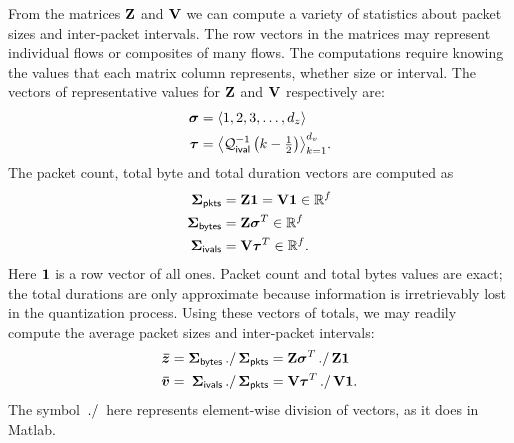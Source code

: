 \documentclass[twocolumn,final]{svjour3}
\begin{document}
From the matrices $\mathbf{Z}$ and $\mathbf{V}$ we can compute a variety of statistics about packet sizes and inter-packet intervals.
The row vectors in the matrices may represent individual flows or composites of many flows.
The computations require knowing the values that each matrix column represents, whether size or interval.
The vectors of representative values for $\mathbf{Z}$ and $\mathbf{V}$ respectively are:
\begin{align}
\vec{\sigma} &= \tuple{1,2,3,\dots,d_z} \\
\vec{\tau}   &= \tuple{\Df_\ival\left(k-\smallfrac{1}{2}\right)}_{k=1}^{d_v}.
\end{align}
The packet count, total byte and total duration vectors are computed as
\begin{align}
\vec{\Sigma}_\pkts  &= \mat{Z}\ones = \mat{V}\ones \in \R^f \eqn{packet-count}\\
\vec{\Sigma}_\bytes &= \mat{Z}\trans{\vec{\sigma}} \in \R^f \eqn{total-bytes} \\
\vec{\Sigma}_\ivals &= \mat{V}\trans{\vec{\tau}} \in \R^f \eqn{total-duration}.
\end{align}
Here $\mathbf{1}$ is a row vector of all ones.\onesnote
Packet count and total bytes values are exact;
the total durations are only approximate because information is irretrievably lost in the quantization process.
Using these vectors of totals, we may readily compute the average packet sizes and inter-packet intervals:
\begin{align}
\vec{\mean{z}} &=
  \vec{\Sigma}_\bytes \eldiv \vec{\Sigma}_\pkts
  \phantom{= \mat{V}\trans{\vec{\tau}} \eldiv \mat{V}\ones}
  \mathllap{= \mat{Z}\trans{\vec{\sigma}} \eldiv \mat{Z}\ones} \\
\vec{\mean{v}} &=
  \phantom{\vec{\Sigma}_\bytes \eldiv \vec{\Sigma}_\pkts}
  \mathllap{\vec{\Sigma_{\ivals}} \eldiv \vec{\Sigma_{\pkts}}}
  = \mat{V}\trans{\vec{\tau}} \eldiv \mat{V}\ones.
\end{align}
The symbol $\,./\,$ here represents element-wise division of vectors, as it does in Matlab.
\end{document}
